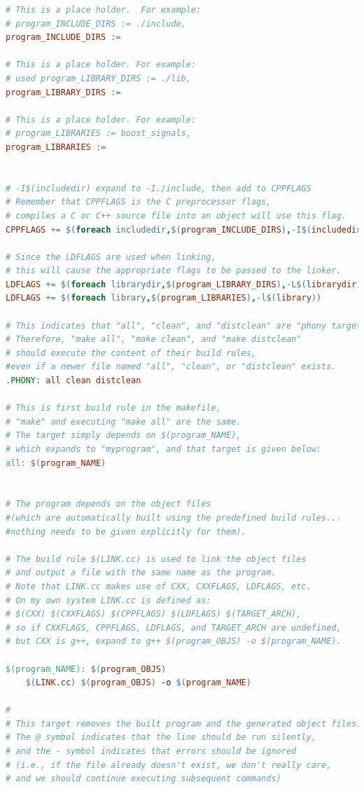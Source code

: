 \documentclass[a4paper,12pt,twoside]{book}
\begin{document}
\begin{itemize}
\begin{itemize}
\begin{itemize}
\begin{lstlisting}[frame=single,  basicstyle=\small, language=make]
# This is a place holder.  For example:
# program_INCLUDE_DIRS := ./include, 
program_INCLUDE_DIRS :=

# This is a place holder. For example:
# used program_LIBRARY_DIRS := ./lib, 
program_LIBRARY_DIRS :=

# This is a place holder. For example:
# program_LIBRARIES := boost_signals, 
program_LIBRARIES :=


# -I$(includedir) expand to -I./include, then add to CPPFLAGS
# Remember that CPPFLAGS is the C preprocessor flags, 
# compiles a C or C++ source file into an object will use this flag.
CPPFLAGS += $(foreach includedir,$(program_INCLUDE_DIRS),-I$(includedir))

# Since the LDFLAGS are used when linking, 
# this will cause the appropriate flags to be passed to the linker.
LDFLAGS += $(foreach librarydir,$(program_LIBRARY_DIRS),-L$(librarydir))
LDFLAGS += $(foreach library,$(program_LIBRARIES),-l$(library))

# This indicates that "all", "clean", and "distclean" are "phony targets". 
# Therefore, "make all", "make clean", and "make distclean"
# should execute the content of their build rules, 
#even if a newer file named "all", "clean", or "distclean" exists.
.PHONY: all clean distclean

# This is first build rule in the makefile, 
# "make" and executing "make all" are the same.
# The target simply depends on $(program_NAME), 
# which expands to "myprogram", and that target is given below:
all: $(program_NAME)


# The program depends on the object files 
#(which are automatically built using the predefined build rules... 
#nothing needs to be given explicitly for them).

# The build rule $(LINK.cc) is used to link the object files
# and output a file with the same name as the program. 
# Note that LINK.cc makes use of CXX, CXXFLAGS, LDFLAGS, etc.
# On my own system LINK.cc is defined as: 
# $(CXX) $(CXXFLAGS) $(CPPFLAGS) $(LDFLAGS) $(TARGET_ARCH),
# so if CXXFLAGS, CPPFLAGS, LDFLAGS, and TARGET_ARCH are undefined,
# but CXX is g++, expand to g++ $(program_OBJS) -o $(program_NAME).

$(program_NAME): $(program_OBJS)
    $(LINK.cc) $(program_OBJS) -o $(program_NAME)

#
# This target removes the built program and the generated object files. 
# The @ symbol indicates that the line should be run silently, 
# and the - symbol indicates that errors should be ignored 
# (i.e., if the file already doesn't exist, we don't really care, 
# and we should continue executing subsequent commands)


\end{lstlisting}
\end{itemize}
\end{itemize}
\end{itemize}
\end{document}
